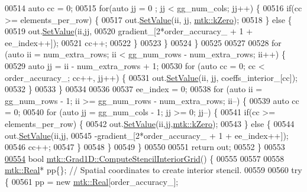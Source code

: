 \begin{DoxyCode}
{{00514     \textcolor{keyword}{auto} cc = 0;
00515     \textcolor{keywordflow}{for}(\textcolor{keyword}{auto} jj = 0 ; jj < gg\_num\_cols; jj++) \{
00516       \textcolor{keywordflow}{if}(cc >= elements\_per\_row) \{
00517         out.\hyperlink{classmtk_1_1DenseMatrix_ae0f873a6d3a734da467cafb817da64ae}{SetValue}(ii, jj, \hyperlink{group__c01-roots_ga59a451a5fae30d59649bcda274fea271}{mtk::kZero});
00518       \} \textcolor{keywordflow}{else} \{
00519         out.\hyperlink{classmtk_1_1DenseMatrix_ae0f873a6d3a734da467cafb817da64ae}{SetValue}(ii,jj,
00520                      gradient\_[2*order\_accuracy\_ + 1 + ee\_index++]);
00521         cc++;
00522       \}
00523     \}
00524   \}
00525 
00527 
00528   \textcolor{keywordflow}{for} (\textcolor{keyword}{auto} ii = num\_extra\_rows; ii < gg\_num\_rows - num\_extra\_rows; ii++) \{
00529     \textcolor{keyword}{auto} jj = ii - num\_extra\_rows + 1;
00530     \textcolor{keywordflow}{for} (\textcolor{keyword}{auto} cc = 0; cc < order\_accuracy\_; cc++, jj++) \{
00531       out.\hyperlink{classmtk_1_1DenseMatrix_ae0f873a6d3a734da467cafb817da64ae}{SetValue}(ii, jj, coeffs\_interior\_[cc]);
00532     \}
00533   \}
00534 
00536 
00537   ee\_index = 0;
00538   \textcolor{keywordflow}{for} (\textcolor{keyword}{auto} ii = gg\_num\_rows - 1; ii >= gg\_num\_rows - num\_extra\_rows; ii--) \{
00539     \textcolor{keyword}{auto} cc = 0;
00540     \textcolor{keywordflow}{for} (\textcolor{keyword}{auto} jj = gg\_num\_cols - 1; jj >= 0; jj--) \{
00541       \textcolor{keywordflow}{if}(cc >= elements\_per\_row) \{
00542         out.\hyperlink{classmtk_1_1DenseMatrix_ae0f873a6d3a734da467cafb817da64ae}{SetValue}(ii,jj,\hyperlink{group__c01-roots_ga59a451a5fae30d59649bcda274fea271}{mtk::kZero});
00543       \} \textcolor{keywordflow}{else} \{
00544         out.\hyperlink{classmtk_1_1DenseMatrix_ae0f873a6d3a734da467cafb817da64ae}{SetValue}(ii,jj,
00545                      -gradient\_[2*order\_accuracy\_ + 1 + ee\_index++]);
00546         cc++;
00547       \}
00548      \}
00549   \}
00550 
00551   \textcolor{keywordflow}{return} out;
00552 \}
00553 
\hypertarget{mtk__grad__1d_8cc_source_l00554}{}\hyperlink{classmtk_1_1Grad1D_ad6df25cc9dfc85ff8562ae3605486976}{00554} \textcolor{keywordtype}{bool} \hyperlink{classmtk_1_1Grad1D_ad6df25cc9dfc85ff8562ae3605486976}{mtk::Grad1D::ComputeStencilInteriorGrid}() \{
00555 
00557 
00558   \hyperlink{group__c01-roots_gac080bbbf5cbb5502c9f00405f894857d}{mtk::Real}* pp\{\}; \textcolor{comment}{// Spatial coordinates to create interior stencil.}
00559 
00560   \textcolor{keywordflow}{try} \{
00561     pp = \textcolor{keyword}{new} \hyperlink{group__c01-roots_gac080bbbf5cbb5502c9f00405f894857d}{mtk::Real}[order\_accuracy\_];
}}
\end{DoxyCode}
